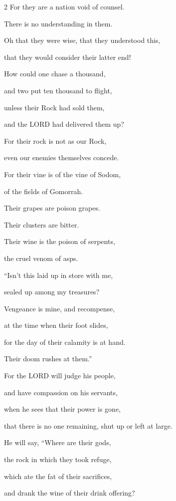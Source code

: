 \begin{multicols}{2}
\vspace{\baselineskip} 
\myverse{}For they are a nation void of counsel.

There is no understanding in them.

\myverse{}Oh that they were wise, that they understood this,

that they would consider their latter end!

\myverse{}How could one chase a thousand,

and two put ten thousand to flight,

unless their Rock had sold them,

and the LORD had delivered them up?

\myverse{}For their rock is not as our Rock,

even our enemies themselves concede.

\myverse{}For their vine is of the vine of Sodom,

of the fields of Gomorrah.

Their grapes are poison grapes.

Their clusters are bitter.

\myverse{}Their wine is the poison of serpents,

the cruel venom of asps.


\vspace{\baselineskip} 
\myverse{}“Isn’t this laid up in store with me,

sealed up among my treasures?

\myverse{}Vengeance is mine, and recompense,

at the time when their foot slides,

for the day of their calamity is at hand.

Their doom rushes at them.”


\vspace{\baselineskip}
 \myverse{}For the LORD will judge his people,

and have compassion on his servants,

when he sees that their power is gone,

that there is no one remaining, shut up or left at large.

\myverse{}He will say, “Where are their gods,

the rock in which they took refuge,

\myverse{}which ate the fat of their sacrifices,

and drank the wine of their drink offering?


\end{multicols}
